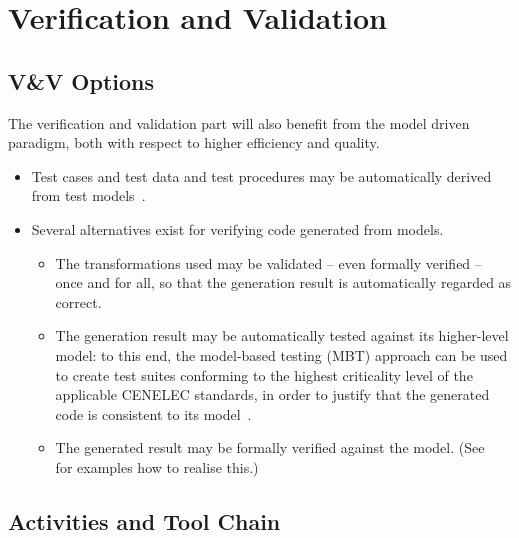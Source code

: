 \documentclass[11pt, a4paper]{article}
\begin{document}
\section{Verification and Validation}



\subsection{V\&V Options}
The verification and validation part will also  benefit from the  model
driven paradigm, both with respect to higher efficiency and quality.
\begin{itemize}
\item Test cases and test data and test procedures may be automatically derived from test models~\cite{PeleskaVL11Nfm,pel2011a}.

\item
Several alternatives exist for verifying code generated from models.
\begin{itemize}
\item The transformations used may be validated -- even formally verified -- once and for all, so that
the generation result is automatically regarded as correct.
\item The generation result may be automatically tested against its higher-level model: to this end, 
the model-based testing (MBT) approach can be used to create test suites conforming to the highest criticality level of the 
applicable CENELEC standards, in order to justify that the generated code is consistent to its model~\cite{PeleskaVL11Nfm,pel2011a,peleska2009d}.
\item The generated result may be formally verified against the model. (See~\cite{RSRSChapter2012,DBLP:journals/fac/HaxthausenPK11} for examples how to realise this.)
\end{itemize}
\end{itemize}


\subsection{Activities and Tool Chain}\label{sec:activitychain}
\end{document}
